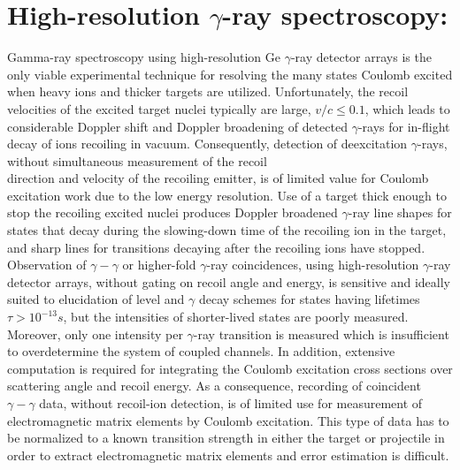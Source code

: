 \documentclass[10pt]{article}
\begin{document}
\section*{High-resolution $\gamma$-ray spectroscopy:}
Gamma-ray spectroscopy using high-resolution Ge $\gamma$-ray detector arrays is the only viable experimental technique for resolving the many states Coulomb excited when heavy ions and thicker targets are utilized. Unfortunately, the recoil velocities of the excited target nuclei typically are large, $v / c \leq 0.1$, which leads to considerable Doppler shift and Doppler broadening of detected $\gamma$-rays for in-flight decay of ions recoiling in vacuum. Consequently, detection of deexcitation $\gamma$-rays, without simultaneous measurement of the recoil\\
direction and velocity of the recoiling emitter, is of limited value for Coulomb excitation work due to the low energy resolution. Use of a target thick enough to stop the recoiling excited nuclei produces Doppler broadened $\gamma$-ray line shapes for states that decay during the slowing-down time of the recoiling ion in the target, and sharp lines for transitions decaying after the recoiling ions have stopped. Observation of $\gamma-\gamma$ or higher-fold $\gamma$-ray coincidences, using high-resolution $\gamma$-ray detector arrays, without gating on recoil angle and energy, is sensitive and ideally suited to elucidation of level and $\gamma$ decay schemes for states having lifetimes $\tau>10^{-13} s$, but the intensities of shorter-lived states are poorly measured. Moreover, only one intensity per $\gamma$-ray transition is measured which is insufficient to overdetermine the system of coupled channels. In addition, extensive computation is required for integrating the Coulomb excitation cross sections over scattering angle and recoil energy. As a consequence, recording of coincident $\gamma-\gamma$ data, without recoil-ion detection, is of limited use for measurement of electromagnetic matrix elements by Coulomb excitation. This type of data has to be normalized to a known transition strength in either the target or projectile in order to extract electromagnetic matrix elements and error estimation is difficult.
\end{document}
